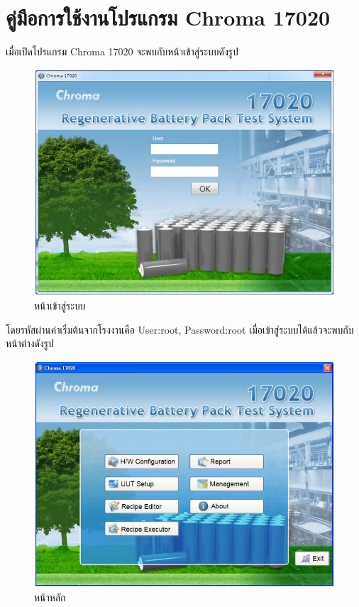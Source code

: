 \chapter{คู่มือการใช้งานโปรแกรม Chroma 17020}
 เมื่อเปิดโปรแกรม Chroma 17020 จะพบกับหน้าเข้าสู่ระบบดังรูป
 \begin{center}
	\begin{figure}[H]
		\includegraphics[width=1\linewidth]{Chapters/img/17020_Program/Loggin.png}
		\centering
		\captionsetup{justification=centering,margin=2cm}
		\caption{หน้าเข้าสู่ระบบ}
	\end{figure}
\end{center}
โดยรหัสผ่านค่าเริ่มต้นจากโรงงานคือ User:root, Password:root เมื่อเข้าสู่ระบบได้แล้วจะพบกับหน้าต่างดังรูป
\begin{center}
	\begin{figure}[H]
		\includegraphics[width=1\linewidth]{Chapters/img/17020_Program/Home.png}
		\centering
		\captionsetup{justification=centering,margin=2cm}
		\caption{หน้าหลัก}
	\end{figure}
\end{center}
